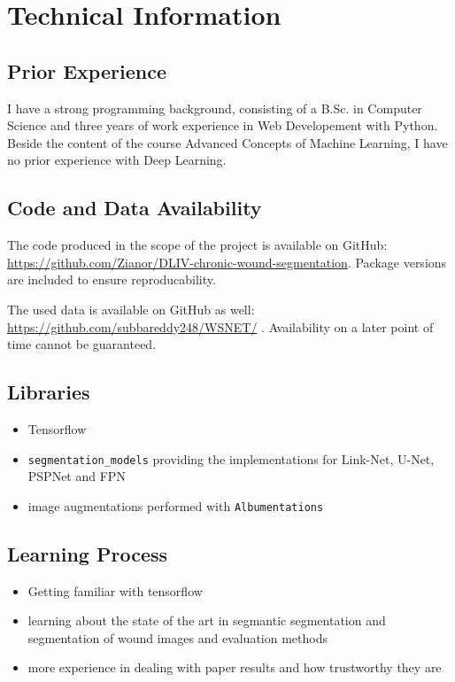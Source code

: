 \section{Technical Information}

\subsection{Prior Experience}

I have a strong programming background, consisting of a B.Sc. in Computer Science and three years of work experience in Web Developement with Python. Beside the content of the course Advanced Concepts of Machine Learning, I have no prior experience with Deep Learning.

\subsection{Code and Data Availability}

The code produced in the scope of the project is available on GitHub: \url{https://github.com/Zianor/DLIV-chronic-wound-segmentation}. Package versions are included to ensure reproducability.

The used data is available on GitHub as well: \url{https://github.com/subbareddy248/WSNET/} \cite{Oota_2021_WACV, Oota_2023_WACV}. Availability on a later point of time cannot be guaranteed.

\subsection{Libraries}

\begin{itemize}
	\item Tensorflow
	\item \texttt{segmentation\_models} \cite{SegmentationModels} providing the implementations for Link-Net, U-Net, PSPNet and FPN
	\item image augmentations performed with \texttt{Albumentations} \cite{albumentations}
\end{itemize}

\subsection{Learning Process}

\begin{itemize}
	\item Getting familiar with tensorflow
	\item learning about the state of the art in segmantic segmentation and segmentation of wound images and evaluation methods
	\item more experience in dealing with paper results and how trustworthy they are
\end{itemize}


